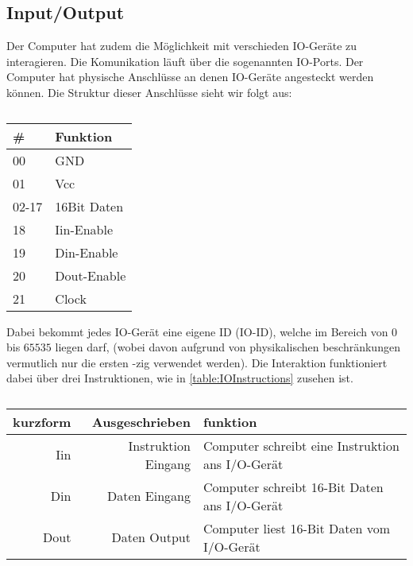 \documentclass{scrartcl}
\begin{document}
\subsection{\label{section:io}Input/Output}

Der Computer hat zudem die Möglichkeit mit verschieden IO-Geräte zu interagieren.
Die Komunikation läuft über die sogenannten IO-Ports.
Der Computer hat physische Anschlüsse an denen IO-Geräte angesteckt werden können.
Die Struktur dieser Anschlüsse sieht wir folgt aus:

\begin{center}
	\begin{table}[h]
		\caption{\label{table:IOPins}}
		\begin{tabular}{l | l}
			\# & Funktion \\
			\hline
			00 & GND \\
			01 & Vcc \\
			02-17 & 16Bit Daten \\
			18 & Iin-Enable \\
			19 & Din-Enable \\
			20 & Dout-Enable \\
			21 & Clock
 		\end{tabular}
	\end{table}
\end{center}

Dabei bekommt jedes IO-Gerät eine eigene ID (IO-ID), welche im Bereich von $0$ bis $65535$ liegen darf, (wobei davon aufgrund von physikalischen beschränkungen vermutlich nur die ersten -zig verwendet werden).
Die Interaktion funktioniert dabei über drei Instruktionen, wie in \autoref{table:IOInstructions} zusehen ist.

\begin{center}
	\begin{table}[h]
		\caption{\label{table:IOInstructions}}
		\begin{tabular}{r | r | l}
			kurzform & Ausgeschrieben & funktion \\
			\hline
			Iin & Instruktion Eingang & Computer schreibt eine Instruktion ans I/O-Gerät \\
			Din & Daten Eingang & Computer schreibt 16-Bit Daten ans I/O-Gerät \\
			Dout &  Daten Output & Computer liest 16-Bit Daten vom I/O-Gerät
 		\end{tabular}
	\end{table}
\end{center}
\end{document}
